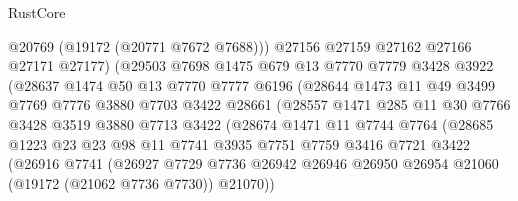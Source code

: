 \begin{lexlean}{RustCore}
\begin{coremodule}
                        @20769
                        (@19172 (@20771 @7672 @7688)))
                      @27156
                      @27159
                      @27162
                      @27166
                      @27171
                      @27177)
                    (@29503
                      @7698
                      @1475
                      @679
                      @13
                      @7770
                      @7779
                      @3428
                      @3922
                      (@28637
                        @1474
                        @50
                        @13
                        @7770
                        @7777
                        @6196
                        (@28644
                          @1473
                          @11
                          @49
                          @3499
                          @7769
                          @7776
                          @3880
                          @7703
                          @3422
                          @28661
                          (@28557
                            @1471
                            @285
                            @11
                            @30
                            @7766
                            @3428
                            @3519
                            @3880
                            @7713
                            @3422
                            (@28674
                              @1471
                              @11
                              @7744
                              @7764
                              (@28685
                                @1223
                                @23
                                @23
                                @98
                                @11
                                @7741
                                @3935
                                @7751
                                @7759
                                @3416
                                @7721
                                @3422
                                (@26916
                                  @7741
                                  (@26927
                                    @7729
                                    @7736
                                    @26942
                                    @26946
                                    @26950
                                    @26954
                                    @21060
                                    (@19172 (@21062 @7736 @7730))
                                    @21070))

\end{coremodule}
\end{lexlean}
